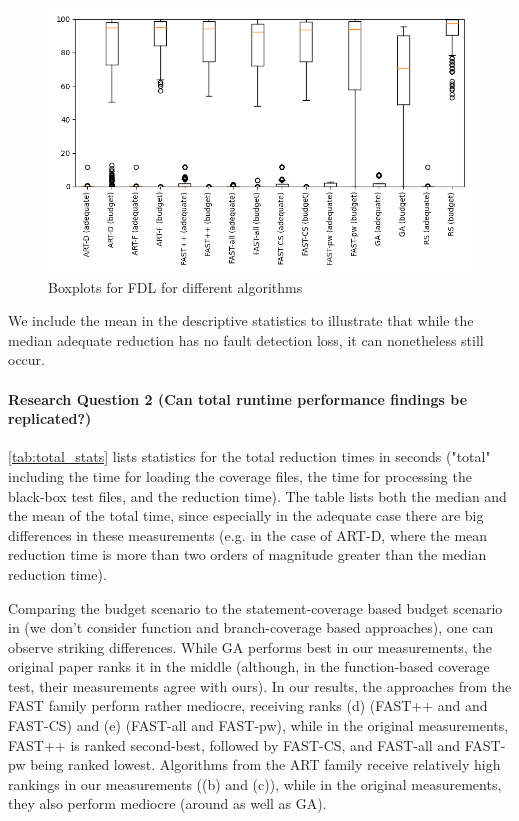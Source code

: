 \begin{figure}[h]
\caption[FDL boxplots]{Boxplots for FDL for different algorithms}\label{fig:fdl_box}
\centering
\includegraphics[scale=0.7]{figures/fdls.png}
\end{figure}

We include the mean in the descriptive statistics to illustrate that
while the median adequate reduction has no fault detection loss, it can
nonetheless still occur.

\paragraph{Research Question 2 (Can total runtime performance findings be replicated?)}

\autoref{tab:total_stats} lists statistics for the total reduction times
in seconds ("total" including the time for loading the coverage files,
the time for processing the black-box test files, and the reduction
time). The table lists both the median and the mean of the total time,
since especially in the adequate case there are big differences in these
measurements (e.g. in the case of ART-D, where the mean reduction time is
more than two orders of magnitude greater than the median reduction time).

Comparing the budget scenario to the statement-coverage based budget
scenario in \cite{cruciani2019scalable} (we don't consider function
and branch-coverage based approaches), one can observe striking
differences. While GA performs best in our measurements, the original
paper ranks it in the middle (although, in the function-based coverage
test, their measurements agree with ours). In our results, the approaches
from the FAST family perform rather mediocre, receiving ranks (d)
(FAST++ and and FAST-CS) and (e) (FAST-all and FAST-pw), while in the
original measurements, FAST++ is ranked second-best, followed by FAST-CS,
and FAST-all and FAST-pw being ranked lowest. Algorithms from the ART
family receive relatively high rankings in our measurements ((b) and
(c)), while in the original measurements, they also perform mediocre
(around as well as GA).

